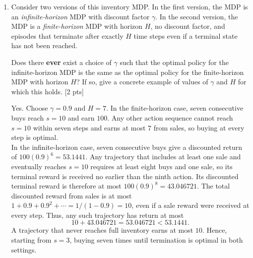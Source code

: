 \documentclass[11pt]{article}
\begin{document}
\begin{enumerate}[label=(\alph*)]
\begin{tcolorbox}[breakable]
\noindent When $\gamma$ is sufficiently close to $1$, avoiding
termination is also optimal. At $s=9$, buying immediately yields
$100$, while selling, buying back to $s=9$, and then buying to
$s=10$ yields $1+100\gamma^2$: the sale reward is received
on the first action and the terminal reward on the third.
For $\gamma$ close enough to $1$, $1+100\gamma^2>100$.
Under this condition, replacing the final buy from $s=9$ with
sell, buy, buy strictly increases the total discounted return.
Thus, no trajectory reaching $s=10$ can
be optimal, and an optimal policy never fully stocks the inventory.
    \end{tcolorbox}
    \newpage

    \item Consider two versions of this inventory MDP. In the first version, the MDP is an \emph{infinite-horizon} MDP with discount factor $\gamma$. In the second version, the MDP is a \emph{finite-horizon} MDP with horizon $H$, no discount factor, and episodes that terminate after exactly $H$ time steps even if a terminal state has not been reached.  

    Does there \textbf{ever} exist a choice of $\gamma$ such that the optimal policy for the infinite-horizon MDP is the same as the optimal policy for the finite-horizon MDP with horizon $H$? If so, give a concrete example of values of $\gamma$ and $H$ for which this holds. [2 pts]
    \begin{tcolorbox}[breakable]
Yes. Choose $\gamma=0.9$ and $H=7$. In the finite-horizon case,
seven consecutive buys reach $s=10$ and earn $100$. Any other
action sequence cannot reach $s=10$ within seven steps and earns
at most $7$ from sales, so buying at every step is optimal.\\

\noindent In the infinite-horizon case, seven consecutive buys
give a discounted return of $100(0.9)^6=53.1441$.
Any trajectory that includes at least one sale and eventually reaches
$s=10$ requires at least eight buys and one sale, so its terminal
reward is received no earlier than the ninth action. Its discounted
terminal reward is therefore at most $100(0.9)^8=43.046721$.
The total discounted reward from sales is at most
$1+0.9+0.9^2+\cdots=1/(1-0.9)=10$, even if a sale reward were
received at every step. Thus, any such trajectory has return at most
\[
10+43.046721=53.046721<53.1441.
\]
A trajectory that never reaches full inventory earns at most $10$.
Hence, starting from $s=3$, buying seven times until termination
is optimal in both settings.


\end{tcolorbox}
\end{enumerate}
\end{document}
